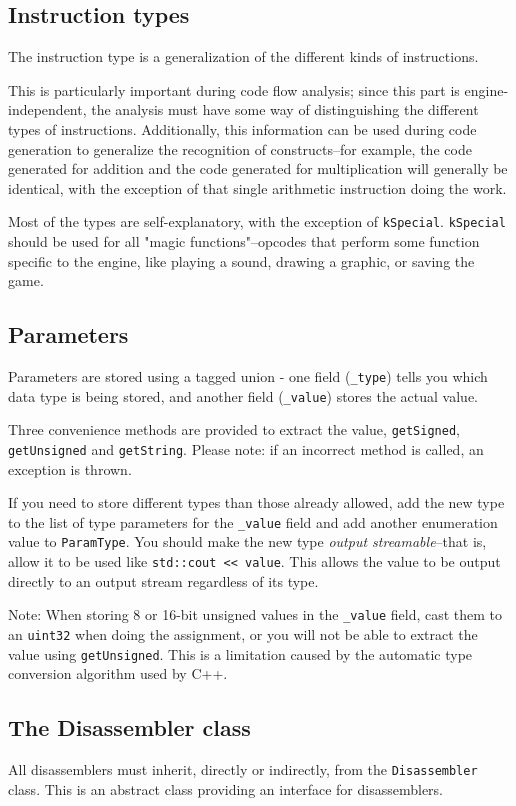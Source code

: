 \subsection{Instruction types}
\label{sec:insttype}
The instruction type is a generalization of the different kinds of instructions.

This is particularly important during code flow analysis; since this part is engine-independent, the analysis must have some way of distinguishing the different types of instructions. Additionally, this information can be used during code generation to generalize the recognition of constructs--for example, the code generated for addition and the code generated for multiplication will generally be identical, with the exception of that single arithmetic instruction doing the work.

Most of the types are self-explanatory, with the exception of \verb+kSpecial+. \verb+kSpecial+ should be used for all "magic functions"--opcodes that perform some function specific to the engine, like playing a sound, drawing a graphic, or saving the game.

\subsection{Parameters}
\label{sec:parameter}
Parameters are stored using a tagged union - one field (\verb+_type+) tells you which data type is being stored, and another field (\verb+_value+) stores the actual value.

Three convenience methods are provided to extract the value, \verb+getSigned+, \verb+getUnsigned+ and \verb+getString+. Please note: if an incorrect method is called, an exception is thrown.

If you need to store different types than those already allowed, add the new type to the list of type parameters for the \verb+_value+ field and add another enumeration value to \verb+ParamType+. You should make the new type \emph{output streamable}--that is, allow it to be used like \verb+std::cout << value+. This allows the value to be output directly to an output stream regardless of its type.

Note: When storing 8 or 16-bit unsigned values in the \verb+_value+ field, cast them to an \verb+uint32+ when doing the assignment, or you will not be able to extract the value using \verb+getUnsigned+. This is a limitation caused by the automatic type conversion algorithm used by C++.

\subsection{The Disassembler class}
All disassemblers must inherit, directly or indirectly, from the \verb+Disassembler+ class. This is an abstract class providing an interface for disassemblers.

